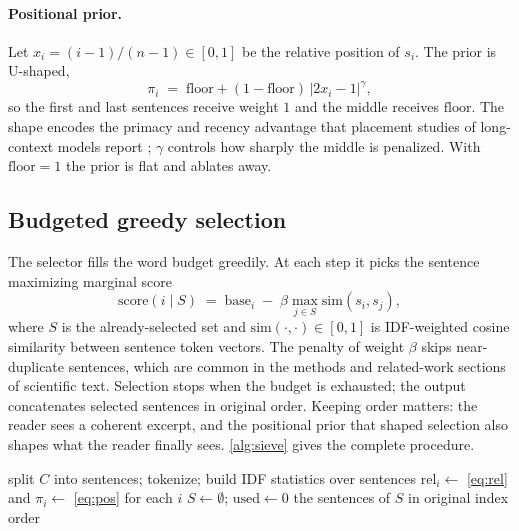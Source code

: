 \documentclass[pdflatex,sn-basic]{sn-jnl}
\DeclarePairedDelimiter\abs{\lvert}{\rvert}
\theoremstyle{remark}
\newcommand{\method}{Sieve}
\begin{document}
\paragraph{Positional prior.}
Let $x_i = (i-1)/(n-1)\in[0,1]$ be the relative position of $s_i$. The
prior is U-shaped,
\begin{equation}
\label{eq:pos}
\pi_i \;=\; \mathrm{floor} + (1-\mathrm{floor})\,
\lvert 2x_i - 1\rvert^{\gamma},
\end{equation}
so the first and last sentences receive weight $1$ and the middle
receives $\mathrm{floor}$. The shape encodes the primacy and recency
advantage that placement studies of long-context models report
\citep{liu2023lost}; $\gamma$ controls how sharply the middle is
penalized. With $\mathrm{floor}=1$ the prior is flat and ablates away.

\subsection{Budgeted greedy selection}
The selector fills the word budget greedily. At each step it picks the
sentence maximizing marginal score
\begin{equation}
\label{eq:mmr}
\mathrm{score}(i \mid S) \;=\; \mathrm{base}_i
\;-\; \beta \max_{j \in S} \mathrm{sim}(s_i, s_j),
\end{equation}
where $S$ is the already-selected set and
$\mathrm{sim}(\cdot,\cdot)\in[0,1]$ is IDF-weighted cosine similarity
between sentence token vectors. The penalty of weight $\beta$ skips
near-duplicate sentences, which are common in the methods and
related-work sections of scientific text. Selection stops when the
budget is exhausted; the output concatenates selected sentences in
original order. Keeping order matters: the reader sees a coherent
excerpt, and the positional prior that shaped selection also shapes
what the reader finally sees. \autoref{alg:sieve} gives the complete
procedure.

\begin{algorithm}[t]
\caption{\method{} selection}
\label{alg:sieve}
split $C$ into sentences; tokenize; build IDF statistics over
sentences\;
$\mathrm{rel}_i \leftarrow$ \eqref{eq:rel} and
$\pi_i \leftarrow$ \eqref{eq:pos} for each $i$\;
$S \leftarrow \emptyset$; $\mathrm{used} \leftarrow 0$\;
\Return the sentences of $S$ in original index order
\end{algorithm}
\end{document}
